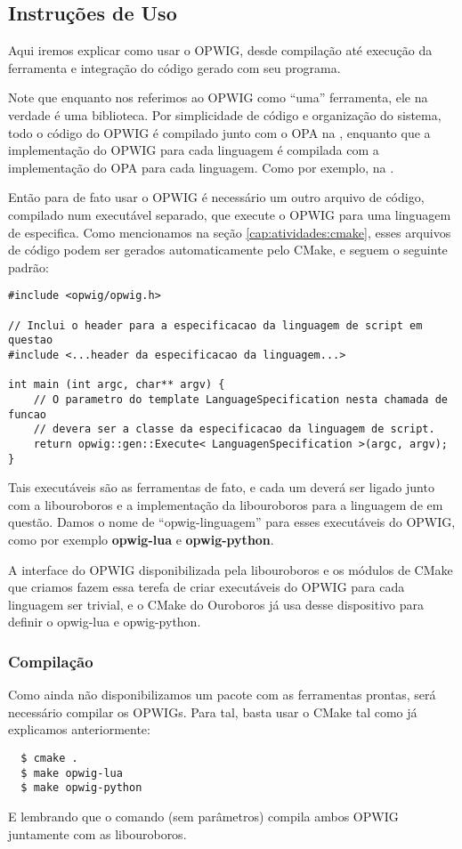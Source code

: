 \subsection{Instruções de Uso}
Aqui iremos explicar como usar o OPWIG, desde compilação até execução da ferramenta
e integração do código gerado com seu programa.

Note que enquanto nos referimos ao OPWIG como ``uma'' ferramenta, ele na verdade
é uma biblioteca. Por simplicidade de código e organização do sistema, 
todo o código do OPWIG é compilado junto com o OPA na , enquanto que 
a implementação do OPWIG para cada linguagem é compilada com a implementação do
OPA para cada linguagem. Como por exemplo, na .

Então para de fato usar o OPWIG é necessário um outro arquivo de código, compilado
num executável separado, que execute o OPWIG para uma linguagem de \script{} especifica.
Como mencionamos na seção \ref{cap:atividades:cmake}, esses arquivos de código podem
ser gerados automaticamente pelo CMake, e seguem o seguinte padrão:
\begin{lstlisting}
#include <opwig/opwig.h>

// Inclui o header para a especificacao da linguagem de script em questao
#include <...header da especificacao da linguagem...>

int main (int argc, char** argv) {
    // O parametro do template LanguageSpecification nesta chamada de funcao
    // devera ser a classe da especificacao da linguagem de script.
    return opwig::gen::Execute< LanguagenSpecification >(argc, argv);
}
\end{lstlisting}
Tais executáveis são as ferramentas de fato, e cada um deverá ser ligado junto com a
libouroboros e a implementação da libouroboros para a linguagem de \script{} em questão. 
Damos o nome de ``opwig-linguagem'' para esses executáveis do OPWIG, como por exemplo
\textbf{opwig-lua} e \textbf{opwig-python}.

A interface do OPWIG disponibilizada pela libouroboros e os módulos de CMake
que criamos fazem essa terefa de criar executáveis do OPWIG para cada linguagem ser trivial,
e o CMake do Ouroboros já usa desse dispositivo para definir o opwig-lua e opwig-python.

\subsubsection{Compilação}
Como ainda não disponibilizamos um pacote com as ferramentas prontas, será necessário
compilar os OPWIGs. Para tal, basta usar o CMake tal como já explicamos anteriormente:
\begin{verbatim}
  $ cmake .
  $ make opwig-lua
  $ make opwig-python
\end{verbatim}
E lembrando que o comando  (sem parâmetros) compila ambos OPWIG juntamente com
as libouroboros.

